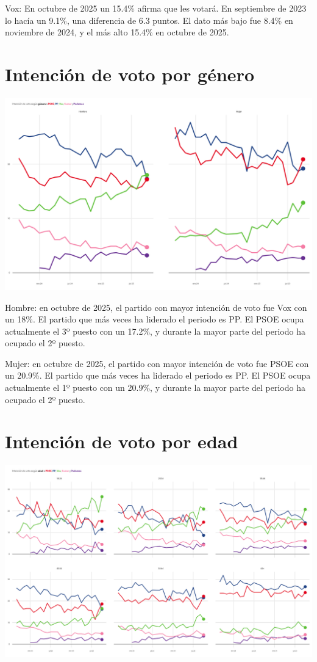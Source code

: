 \documentclass[
  letterpaper,
  DIV=11,
  numbers=noendperiod]{scrreprt}
\begin{document}
{Vox}: En octubre de 2025 un 15.4\% afirma que les votará. En septiembre
de 2023 lo hacía un 9.1\%, una diferencia de 6.3 puntos. El dato más
bajo fue 8.4\% en noviembre de 2024, y el más alto 15.4\% en octubre de
2025.

\chapter{Intención de voto por
género}\label{intenciuxf3n-de-voto-por-guxe9nero}

\includegraphics[width=8in,height=\textheight,keepaspectratio]{figures/p_idv_genero_static.png}

Hombre: en octubre de 2025, el partido con mayor intención de voto fue
Vox con un 18\%. El partido que más veces ha liderado el periodo es PP.
El PSOE ocupa actualmente el 3º puesto con un 17.2\%, y durante la mayor
parte del periodo ha ocupado el 2º puesto.

Mujer: en octubre de 2025, el partido con mayor intención de voto fue
PSOE con un 20.9\%. El partido que más veces ha liderado el periodo es
PP. El PSOE ocupa actualmente el 1º puesto con un 20.9\%, y durante la
mayor parte del periodo ha ocupado el 2º puesto.

\chapter{Intención de voto por
edad}\label{intenciuxf3n-de-voto-por-edad}

\includegraphics[width=8in,height=\textheight,keepaspectratio]{figures/p_idv_edad_static.png}
\end{document}
